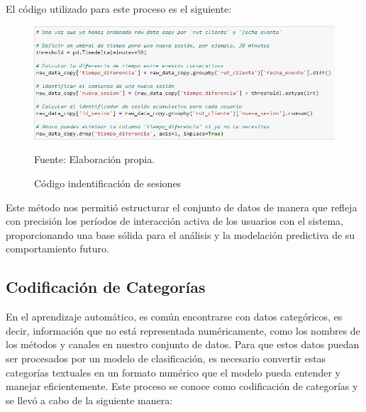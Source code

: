 El código utilizado para este proceso es el siguiente:

\begin{figure}[H]
    \begin{minipage}[t]{0.9\textwidth}
        \caption{Código indentificación de sesiones}
        \label{identificación_sesiones}        
    \end{minipage}

    \vspace{10pt}

    \begin{minipage}[b]{1\textwidth}
        \centering
        \includegraphics[width=\textwidth]{img/Código identificación sesiones.jpg}        
    \end{minipage}

    \begin{minipage}[t]{0.9\textwidth}
        Fuente: Elaboración propia.
    \end{minipage}
\end{figure}

Este método nos permitió estructurar el conjunto de datos de manera que refleja con precisión los períodos de interacción activa de los usuarios con el sistema, proporcionando una base sólida para el análisis y la modelación predictiva de su comportamiento futuro.

\subsection{Codificación de Categorías}

En el aprendizaje automático, es común encontrarse con datos categóricos, es decir, información que no está representada numéricamente, como los nombres de los métodos y canales en nuestro conjunto de datos. Para que estos datos puedan ser procesados por un modelo de clasificación, es necesario convertir estas categorías textuales en un formato numérico que el modelo pueda entender y manejar eficientemente. Este proceso se conoce como codificación de categorías y se llevó a cabo de la siguiente manera:

